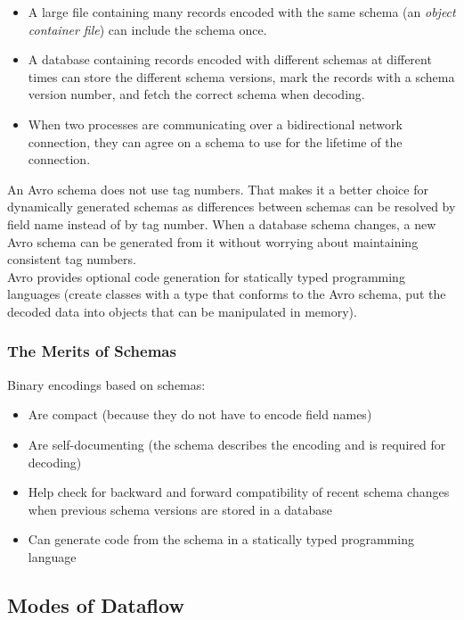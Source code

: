 \documentclass[12pt, titlepage]{article}
\begin{document}
\begin{itemize}
    \item A large file containing many records encoded with the same schema (an \textit{object container file}) can include the schema once.
    \item A database containing records encoded with different schemas at different times can store the different schema versions, mark the records with a schema version number, and fetch the correct schema when decoding.
    \item When two processes are communicating over a bidirectional network connection, they can agree on a schema to use for the lifetime of the connection.
\end{itemize}

An Avro schema does not use tag numbers. That makes it a better choice for dynamically generated schemas as differences between schemas can be resolved by field name instead of by tag number. When a database schema changes, a new Avro schema can be generated from it without worrying about maintaining consistent tag numbers. \\

Avro provides optional code generation for statically typed programming languages (create classes with a type that conforms to the Avro schema, put the decoded data into objects that can be manipulated in memory).

\subsubsection{The Merits of Schemas}

Binary encodings based on schemas:
\begin{itemize}
    \item Are compact (because they do not have to encode field names)
    \item Are self-documenting (the schema describes the encoding and is required for decoding)
    \item Help check for backward and forward compatibility of recent schema changes when previous schema versions are stored in a database
    \item Can generate code from the schema in a statically typed programming language
\end{itemize}

\subsection{Modes of Dataflow}
\end{document}
